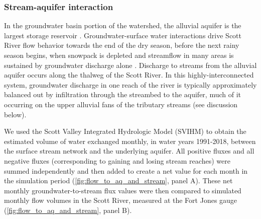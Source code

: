 \documentclass[hess, manuscript]{copernicus}
\begin{document}
\subsubsection{Stream-aquifer interaction}

In the groundwater basin portion of the watershed, the alluvial aquifer
is the largest storage reservoir \citep{Mack1958}. Groundwater-surface
water interactions drive Scott River flow behavior towards the end of
the dry season, before the next rainy season begins, when snowpack is
depleted and streamflow in many areas is sustained by groundwater
discharge alone \citep{Foglia2018a}. Discharge to streams from the
alluvial aquifer occurs along the thalweg of the Scott River. In this
highly-interconnected system, groundwater discharge in one reach of the
river is typically approximately balanced out by infiltration through
the streambed to the aquifer, much of it occurring on the upper alluvial
fans of the tributary streams (see discussion below).

We used the Scott Valley Integrated Hydrologic Model (SVIHM)
\citep{Tolley2019, Foglia2013a, Foglia2013b} to obtain the estimated
volume of water exchanged monthly, in water years 1991-2018, between the
surface stream network and the underlying aquifer. All positive fluxes
and all negative fluxes (corresponding to gaining and losing stream
reaches) were summed independently and then added to create a net value
for each month in the simulation period
(\autoref{fig:flow_to_aq_and_stream}, panel A). These net monthly
groundwater-to-stream flux values were then compared to simulated
monthly flow volumes in the Scott River, measured at the Fort Jones
gauge (\autoref{fig:flow_to_aq_and_stream}, panel B).
\end{document}
